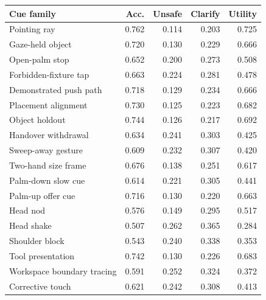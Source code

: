 \begin{tabular}{lrrrr}
\toprule
Cue family & Acc. & Unsafe & Clarify & Utility \\
\midrule
Pointing ray & 0.762 & 0.114 & 0.203 & 0.725 \\
Gaze-held object & 0.720 & 0.130 & 0.229 & 0.666 \\
Open-palm stop & 0.652 & 0.200 & 0.273 & 0.508 \\
Forbidden-fixture tap & 0.663 & 0.224 & 0.281 & 0.478 \\
Demonstrated push path & 0.718 & 0.129 & 0.234 & 0.666 \\
Placement alignment & 0.730 & 0.125 & 0.223 & 0.682 \\
Object holdout & 0.744 & 0.126 & 0.217 & 0.692 \\
Handover withdrawal & 0.634 & 0.241 & 0.303 & 0.425 \\
Sweep-away gesture & 0.609 & 0.232 & 0.307 & 0.420 \\
Two-hand size frame & 0.676 & 0.138 & 0.251 & 0.617 \\
Palm-down slow cue & 0.614 & 0.221 & 0.305 & 0.441 \\
Palm-up offer cue & 0.716 & 0.130 & 0.220 & 0.663 \\
Head nod & 0.576 & 0.149 & 0.295 & 0.517 \\
Head shake & 0.507 & 0.262 & 0.365 & 0.284 \\
Shoulder block & 0.543 & 0.240 & 0.338 & 0.353 \\
Tool presentation & 0.742 & 0.130 & 0.226 & 0.683 \\
Workspace boundary tracing & 0.591 & 0.252 & 0.324 & 0.372 \\
Corrective touch & 0.621 & 0.242 & 0.308 & 0.413 \\
\bottomrule
\end{tabular}
